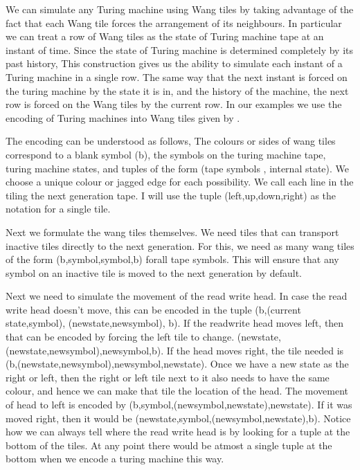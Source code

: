 \documentclass{article}
\begin{document}
We can simulate any Turing machine using Wang tiles by taking advantage of the fact that each Wang tile forces the arrangement of its neighbours. In particular we can treat a row of Wang tiles as the state of Turing machine tape at an instant of time. Since the state of Turing machine is determined completely by its past history, This construction gives us the ability to simulate each instant of a Turing machine in a single row. The same way that the next instant is forced on the turing machine by the state it is in, and the history of the machine, the next row is forced on the Wang tiles by the current row. In our examples we use the encoding of Turing machines into Wang tiles given by \cite{chaitin}.

The encoding can be understood as follows, The colours or sides of wang tiles correspond to a blank symbol (b), the symbols on the turing machine tape, turing machine states, and tuples of the form (tape symbols , internal state). We choose a unique colour or jagged edge for each possibility. We call each line in the tiling the next generation tape. I will use the tuple (left,up,down,right) as the notation for a single tile.

Next we formulate the wang tiles themselves. We need tiles that can transport inactive tiles directly to the next generation. For this, we need as many wang tiles of the form (b,symbol,symbol,b) forall tape symbols. This will ensure that any symbol on an inactive tile is moved to the next generation by default.

Next we need to simulate the movement of the read write head. In case the read write head doesn't move, this can be encoded in the tuple (b,(current state,symbol), (newstate,newsymbol), b). If the readwrite head moves left, then that can be encoded by forcing the left tile to change. (newstate,(newstate,newsymbol),newsymbol,b). If the head moves right, the tile needed is (b,(newstate,newsymbol),newsymbol,newstate). Once we have a new state as the right or left, then the right or left tile next to it also needs to have the same colour, and hence we can make that tile the location of the head. The movement of head to left is encoded by (b,symbol,(newsymbol,newstate),newstate). If it was moved right, then it would be (newstate,symbol,(newsymbol,newstate),b). Notice how we can always tell where the read write head is by looking for a tuple at the bottom of the tiles. At any point there would be atmost a single tuple at the bottom when we encode a turing machine this way.
\end{document}
